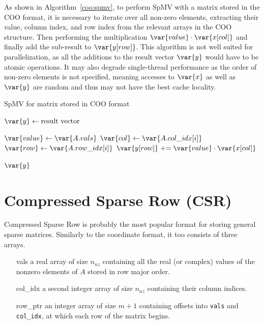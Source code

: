 \documentclass[thesis=M,english]{FITthesis}[2019/12/23]
\newcommand{\pluseq}{\mathrel{+}=}
\begin{document}
As shown in Algorithm~\ref{coo:spmv}, to perform SpMV with a matrix stored in the COO format, it is necessary
to iterate over all non-zero elements, extracting their value, column index, and row index from the
relevant arrays in the COO structure. Then performing the multiplication \(\var{value} \cdot \var{x[col]}\) and
finally add the sub-result to \(\var{y[row]}\). This algorithm is not well suited for parallelization,
as all the additions to the result vector \(\var{y}\) would have to be atomic operations. It may also
degrade single-thread performance as the order of non-zero elements is not specified, meaning accesses to $\var{x}$
as well as $\var{y}$ are random and thus may not have the best cache locality.

\begin{algorithm}
    \caption{SpMV for matrix stored in COO format}\label{coo:spmv}
    \begin{algorithmic}
        \State $\var{y} \gets \text{result vector}$

        \State $\var{value} \gets \var{A.vals}$
        \State $\var{col} \gets \var{A.col\_idx[i]}$
        \State $\var{row} \gets \var{A.row\_idx[i]}$
        \State $\var{y[row]} \pluseq \var{value} \cdot \var{x[col]}$
        \EndFor

        \Return $\var{y}$
        \EndFunction
    \end{algorithmic}
\end{algorithm}

\section{Compressed Sparse Row (CSR)}\label{smsf:csr}

Compressed Sparse Row is probably the most popular format for storing general sparse matrices.
\cite{saad03:IMS} Similarly to the coordinate format, it too consists of three arrays.

\begin{enumerate}
    \itemsep=0em
    \item[vals] a real array of size $n_{nz}$ containing all the real (or complex) values of the nonzero elements of $A$
        stored in row major order.
    \item[col\_idx] a second integer array of size $n_{nz}$ containing their column indices.
    \item[row\_ptr] an integer array of size $m + 1$ containing offsets into \lstinline{vals} and
        \lstinline!col_idx!, at which each row of the matrix begins.
\end{enumerate}
\end{document}
